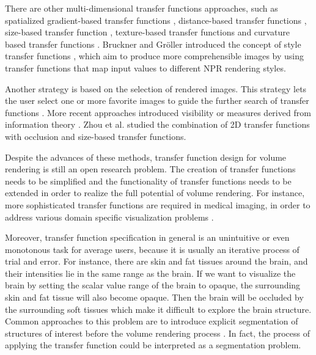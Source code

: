 There are other multi-dimensional transfer functions approaches, such as spatialized gradient-based transfer functions \cite{roettger_spatialized_2005}, distance-based transfer functions \cite{tappenbeck_distance-based_2006}, size-based transfer function \cite{correa_size-based_2008}, texture-based transfer functions \cite{caban_texture-based_2008} \cite{alper_selver_exploring_2015} and curvature based transfer functions \cite{kindlmann_curvature-based_2003}.
Bruckner and Gr{\"o}ller introduced the concept of style transfer functions \cite{bruckner_style_2007}, which aim to produce more comprehensible images by using transfer functions that map input values to different NPR rendering styles.

Another strategy is based on the selection of rendered images. This strategy lets the user select one or more favorite images to guide the further search of transfer functions \cite{marks_design_1997} \cite{wu_interactive_2007}. More recent approaches introduced visibility \cite{correa_visibility_2011} or measures derived from information theory \cite{haidacher_information-based_2008} \cite{bruckner_isosurface_2010} \cite{ruiz_automatic_2011} \cite{bramon_information_2013}. Zhou et al. \cite{zhou_transfer_2012} studied the combination of 2D transfer functions with occlusion and size-based transfer functions.

Despite the advances of these methods, transfer function design for volume rendering is still an open research problem.
The creation of transfer functions needs to be simplified and the functionality of transfer functions needs to be extended in order to realize the full potential of volume rendering. For instance, more sophisticated transfer functions are required in medical imaging, in order to address various domain specific visualization problems \cite{lindholm_spatial_2010}.

Moreover, transfer function specification in general is an unintuitive or even monotonous task for average users, because it is usually an iterative process of trial and error.
For instance, there are skin and fat tissues around the brain, and their intensities lie in the same range as the brain. If we want to visualize the brain by setting the scalar value range of the brain to opaque, the surrounding skin and fat tissue will also become opaque. Then the brain will be occluded by the surrounding soft tissues which make it difficult to explore the brain structure.
Common approaches to this problem are to introduce explicit segmentation of structures of interest before the volume rendering process \cite{rezk-salama_opacity_2006}. In fact, the process of applying the transfer function could be interpreted as a segmentation problem.

